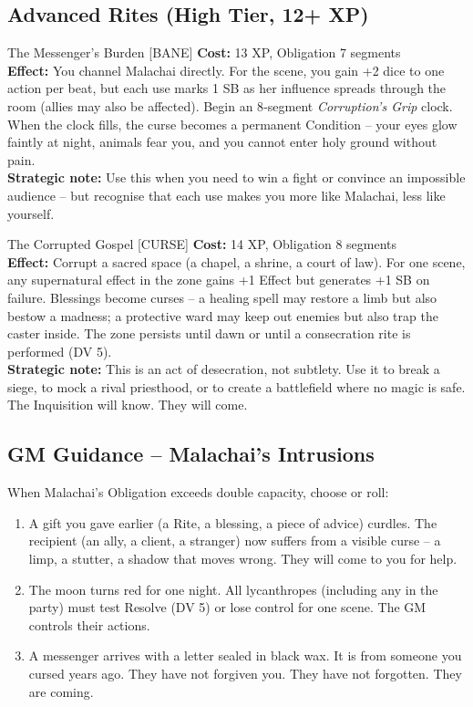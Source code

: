 \documentclass[10pt,a5paper]{book}
\begin{document}
\subsection*{Advanced Rites (High Tier, 12+ XP)}

\begin{patronbox}{The Messenger’s Burden [BANE]}
\textbf{Cost:} 13 XP, Obligation 7 segments \\
\textbf{Effect:} You channel Malachai directly. For the scene, you gain +2 dice to one action per beat, but each use marks 1 SB as her influence spreads through the room (allies may also be affected). Begin an 8‑segment \textit{Corruption’s Grip} clock. When the clock fills, the curse becomes a permanent Condition – your eyes glow faintly at night, animals fear you, and you cannot enter holy ground without pain. \\
\textbf{Strategic note:} Use this when you need to win a fight or convince an impossible audience – but recognise that each use makes you more like Malachai, less like yourself.
\end{patronbox}

\begin{patronbox}{The Corrupted Gospel [CURSE]}
\textbf{Cost:} 14 XP, Obligation 8 segments \\
\textbf{Effect:} Corrupt a sacred space (a chapel, a shrine, a court of law). For one scene, any supernatural effect in the zone gains +1 Effect but generates +1 SB on failure. Blessings become curses – a healing spell may restore a limb but also bestow a madness; a protective ward may keep out enemies but also trap the caster inside. The zone persists until dawn or until a consecration rite is performed (DV 5). \\
\textbf{Strategic note:} This is an act of desecration, not subtlety. Use it to break a siege, to mock a rival priesthood, or to create a battlefield where no magic is safe. The Inquisition will know. They will come.
\end{patronbox}

\subsection*{GM Guidance – Malachai’s Intrusions}

When Malachai’s Obligation exceeds double capacity, choose or roll:
\begin{enumerate}
    \item A gift you gave earlier (a Rite, a blessing, a piece of advice) curdles. The recipient (an ally, a client, a stranger) now suffers from a visible curse – a limp, a stutter, a shadow that moves wrong. They will come to you for help.
    \item The moon turns red for one night. All lycanthropes (including any in the party) must test Resolve (DV 5) or lose control for one scene. The GM controls their actions.
    \item A messenger arrives with a letter sealed in black wax. It is from someone you cursed years ago. They have not forgiven you. They have not forgotten. They are coming.
\end{enumerate}
\end{document}
